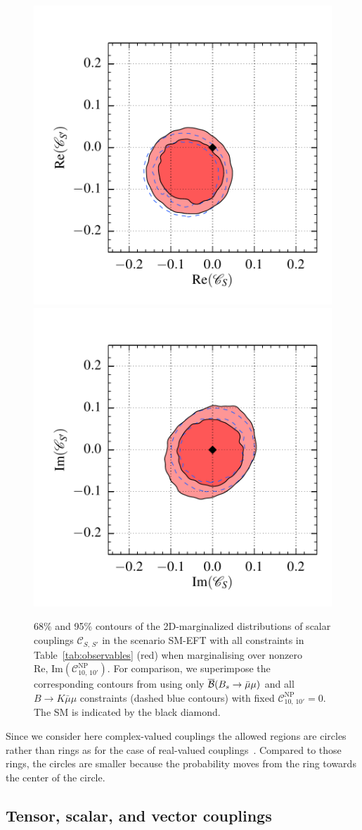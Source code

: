 \documentclass[twocolumn,epjc3]{svjour3}
\numberwithin{equation}{section}
\def \reftab#1{Table~\ref{#1}}
\newcommand{\checked}[1]{{\color{brown}{ {\bf Checked: }{#1}}}}
\renewcommand{\checked}[1]{#1}
\newcommand{\wilson}[2][{}]{\mathcal{C}_{#2}^{\mathrm{#1}}}
\renewcommand{\[}{\big[}
\renewcommand{\]}{\big]}
\renewcommand{\(}{\big(}
\renewcommand{\)}{\big)}
\begin{document}
\begin{figure}
  \begin{center}
      \includegraphics[width=.35\textwidth]{plots/pdf/smEFTS_K_Bsmumu,smEFTS10_K_KstarBR_Bsmumu_0,2}
      \includegraphics[width=.35\textwidth]{plots/pdf/smEFTS_K_Bsmumu,smEFTS10_K_KstarBR_Bsmumu_1,3}
    \end{center}
    \caption{ 68\% and 95\% contours of the 2D-marginalized distributions of
      scalar couplings $\wilson{S,\,S'}$ in the scenario SM-EFT with all
      constraints in \reftab{tab:observables} (red) when marginalising over
      nonzero $\mbox{Re, Im} (\wilson[NP]{10,\,10'})$.  For comparison, we
      superimpose the corresponding contours from using only $\overline{\cal
        B}(B_s\to \bar\mu\mu)$ and all {$B \to K \bar\mu\mu$} constraints
      (dashed blue contours) with fixed $\wilson[NP]{10,\,10'} = 0$.  The SM is
      indicated by the black diamond.  \checked{}}
  \label{fig:scalar:SM-EFT}
\end{figure}

Since we consider here complex-valued couplings the allowed regions are circles
rather than rings as for the case of real-valued
couplings~\cite{Alonso:2014csa}. Compared to those rings, the circles are
smaller because the probability moves from the ring towards the center of the
circle.

%
%
\subsection{Tensor, scalar, and vector couplings \label{sec:tensor:scalar}}
\end{document}
